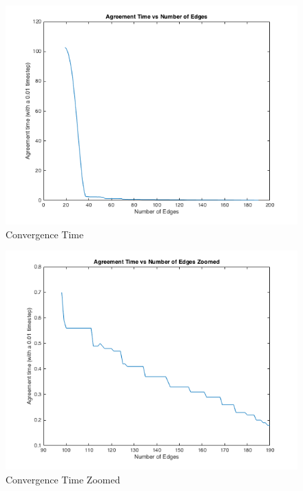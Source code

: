 \documentclass{article}
\begin{document}
\begin{figure}[h!]
\caption{Convergence Time}
\centering
\includegraphics[width=\textwidth]{./Agreement_time-edges.png}
\end{figure}
\begin{figure}[h!]
\caption{Convergence Time Zoomed}
\centering
\includegraphics[width=\textwidth]{./Agreement_time-edges_zoomed.png}
\end{figure}
\end{document}
